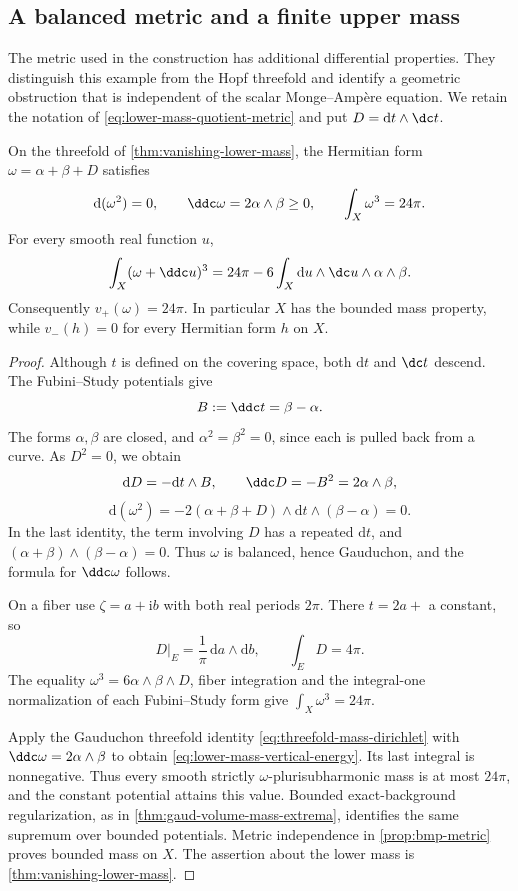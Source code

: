 \subsection{A balanced metric and a finite upper mass}
\label{sec:lower-mass-metric-geometry}

The metric used in the construction has additional differential properties. They distinguish this example from the Hopf threefold and identify a geometric obstruction that is independent of the scalar Monge--Amp\`ere equation. We retain the notation of \cref{eq:lower-mass-quotient-metric} and put $D=\mathrm{d}t\wedge\dc t$.

\begin{proposition}\label{prop:lower-mass-balanced-metric}
On the threefold of \cref{thm:vanishing-lower-mass}, the Hermitian form $\omega=\alpha+\beta+D$ satisfies
\[
 \mathrm{d}(\omega^2)=0,\qquad \ddc\omega=2\alpha\wedge\beta\geq0,
 \qquad \int_X\omega^3=24\pi.
\]
For every smooth real function $u$,
\begin{equation}\label{eq:lower-mass-vertical-energy}
 \int_X(\omega+\ddc u)^3
 =24\pi-6\int_X\mathrm{d}u\wedge\dc u\wedge\alpha\wedge\beta.
\end{equation}
Consequently $v_+(\omega)=24\pi$. In particular $X$ has the bounded mass property, while $v_-(h)=0$ for every Hermitian form $h$ on $X$.
\end{proposition}
\begin{proof}
Although $t$ is defined on the covering space, both $\mathrm{d}t$ and $\dc t$ descend. The Fubini--Study potentials give
\[
 B:=\ddc t=\beta-\alpha.
\]
The forms $\alpha,\beta$ are closed, and $\alpha^2=\beta^2=0$, since each is pulled back from a curve. As $D^2=0$, we obtain
\[
 \mathrm{d}D=-\mathrm{d}t\wedge B,\qquad
 \ddc D=-B^2=2\alpha\wedge\beta,
\]
\[
 \mathrm{d}(\omega^2)
 =-2(\alpha+\beta+D)\wedge\mathrm{d}t\wedge(\beta-\alpha)=0.
\]
In the last identity, the term involving $D$ has a repeated $\mathrm{d}t$, and
$(\alpha+\beta)\wedge(\beta-\alpha)=0$. Thus $\omega$ is balanced, hence Gauduchon, and the formula for $\ddc\omega$ follows.

On a fiber use $\zeta=a+\mathrm{i}b$ with both real periods $2\pi$. There $t=2a+$ a constant, so
\[
 D|_E=\frac1\pi\,\mathrm{d}a\wedge\mathrm{d}b,
 \qquad \int_ED=4\pi.
\]
The equality $\omega^3=6\alpha\wedge\beta\wedge D$, fiber integration and the integral-one normalization of each Fubini--Study form give $\int_X\omega^3=24\pi$.

Apply the Gauduchon threefold identity \eqref{eq:threefold-mass-dirichlet} with $\ddc\omega=2\alpha\wedge\beta$ to obtain \eqref{eq:lower-mass-vertical-energy}. Its last integral is nonnegative. Thus every smooth strictly $\omega$-plurisubharmonic mass is at most $24\pi$, and the constant potential attains this value. Bounded exact-background regularization, as in \cref{thm:gaud-volume-mass-extrema}, identifies the same supremum over bounded potentials. Metric independence in \cref{prop:bmp-metric} proves bounded mass on $X$. The assertion about the lower mass is \cref{thm:vanishing-lower-mass}.
\end{proof}

